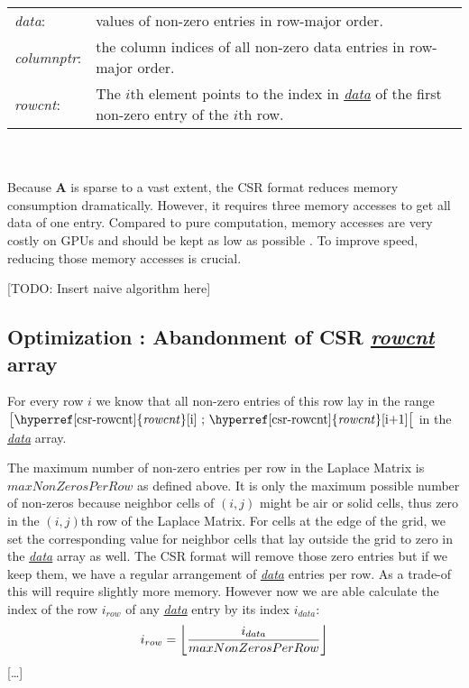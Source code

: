 \begin{tabular}{ll}
	\textit{data\label{csr-data}}: & values of non-zero entries in row-major order.\\
	\textit{columnptr\label{csr-columnptr}}: & the column indices of all non-zero data entries in row-major order.\\
	\textit{rowcnt\label{csr-rowcnt}}: & The $i$th element points to the index in \hyperref[csr-data]{\textit{data}} of the first non-zero entry of the $i$th row.
\end{tabular}\\\\
Because \textbf{A} is sparse to a vast extent, the CSR format reduces memory consumption dramatically. However, it requires three memory accesses to get all data of one entry. Compared to pure computation, memory accesses are very costly on GPUs and should be kept as low as possible \parencite{fang2018benchmarking}\parencite{fujii2013data}. To improve speed, reducing those memory accesses is crucial.

[TODO: Insert naive algorithm here]
\newpage


\subsection{Optimization : Abandonment of CSR \hyperref[csr-rowcnt]{\textit{rowcnt}} array}\label{optimization1}
For every row $i$ we know that all non-zero entries of this row lay in the range $\big[\text{\hyperref[csr-rowcnt]{\textit{rowcnt}}[i] ; \hyperref[csr-rowcnt]{\textit{rowcnt}}[i+1]}\big[$ in the \hyperref[csr-data]{\textit{data}} array. 
\par The maximum number of non-zero entries per row in the Laplace Matrix is $maxNonZerosPerRow$ as defined above. It is only the maximum possible number of non-zeros because neighbor cells of $(i,j)$ might be air or solid cells, thus zero in the $(i,j)$th row of the Laplace Matrix. For cells at the edge of the grid, we set the corresponding value for neighbor cells that lay outside the grid to zero in the \hyperref[csr-data]{\textit{data}} array as well. The CSR format will remove those zero entries but if we keep them, we have a regular arrangement of \hyperref[csr-data]{\textit{data}} entries per row. As a trade-of this will require slightly more memory. However now we are able calculate the index of the row $i_{row}$ of any \hyperref[csr-data]{\textit{data}} entry by its index $i_{data}$:
\begin{equation} \label{row-index-by-data-index}
	i_{row} = \floor*{\frac{i_{data}}{maxNonZerosPerRow}}
\end{equation}
[\dots]
\newpage

